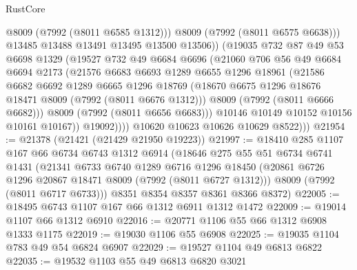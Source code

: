 \begin{lexlean}{RustCore}
\begin{coremodule}
                        @8009
                        (@7992 (@8011 @6585 @1312)))
                      @8009
                      (@7992 (@8011 @6575 @6638)))
                    @13485
                    @13488
                    @13491
                    @13495
                    @13500
                    @13506))
                (@19035
                  @732
                  @87
                  @49
                  @53
                  @6698
                  @1329
                  (@19527
                    @732
                    @49
                    @6684
                    @6696
                    (@21060
                      @706
                      @56
                      @49
                      @6684
                      @6694
                      @2173
                      (@21576
                        @6683
                        @6693
                        @1289
                        @6655
                        @1296
                        @18961
                        (@21586
                          @6682
                          @6692
                          @1289
                          @6665
                          @1296
                          @18769
                          (@18670 @6675 @1296 @18676 @18471 @8009 (@7992 (@8011 @6676 @1312)))
                          @8009
                          (@7992 (@8011 @6666 @6682)))
                        @8009
                        (@7992 (@8011 @6656 @6683)))
                      @10146
                      @10149
                      @10152
                      @10156
                      @10161
                      @10167))
                  @19092))))
          @10620
          @10623
          @10626
          @10629
          @8522)))
@21954 := @21378 (@21421 (@21429 @21950 @19223))
@21997 := @18410
    @285
    @1107
    @167
    @66
    @6734
    @6743
    @1312
    @6914
    (@18646
      @275
      @55
      @51
      @6734
      @6741
      @1431
      (@21341
        @6733
        @6740
        @1289
        @6716
        @1296
        @18450
        (@20861 @6726 @1296 @20867 @18471 @8009 (@7992 (@8011 @6727 @1312)))
        @8009
        (@7992 (@8011 @6717 @6733)))
      @8351
      @8354
      @8357
      @8361
      @8366
      @8372)
@22005 := @18495 @6743 @1107 @167 @66 @1312 @6911 @1312 @1472
@22009 := @19014 @1107 @66 @1312 @6910
@22016 := @20771 @1106 @55 @66 @1312 @6908 @1333 @1175
@22019 := @19030 @1106 @55 @6908
@22025 := @19035 @1104 @783 @49 @54 @6824 @6907
@22029 := @19527 @1104 @49 @6813 @6822
@22035 := @19532 @1103 @55 @49 @6813 @6820 @3021

\end{coremodule}
\end{lexlean}
